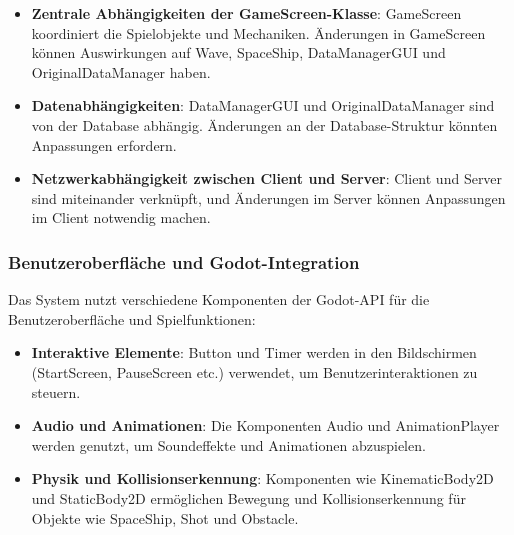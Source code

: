 \documentclass[10pt]{article}
\begin{document}
\begin{itemize}
    \item \textbf{Zentrale Abhängigkeiten der GameScreen-Klasse}: GameScreen koordiniert die Spielobjekte und Mechaniken. Änderungen in GameScreen können Auswirkungen auf Wave, SpaceShip, DataManagerGUI und OriginalDataManager haben.

    \item \textbf{Datenabhängigkeiten}: DataManagerGUI und OriginalDataManager sind von der Database abhängig. Änderungen an der Database-Struktur könnten Anpassungen erfordern.

    \item \textbf{Netzwerkabhängigkeit zwischen Client und Server}: Client und Server sind miteinander verknüpft, und Änderungen im Server können Anpassungen im Client notwendig machen.
\end{itemize}

\subsubsection{Benutzeroberfläche und Godot-Integration}

Das System nutzt verschiedene Komponenten der Godot-API für die Benutzeroberfläche und Spielfunktionen:

\begin{itemize}
    \item \textbf{Interaktive Elemente}: Button und Timer werden in den Bildschirmen (StartScreen, PauseScreen etc.) verwendet, um Benutzerinteraktionen zu steuern.

    \item \textbf{Audio und Animationen}: Die Komponenten Audio und AnimationPlayer werden genutzt, um Soundeffekte und Animationen abzuspielen.

    \item \textbf{Physik und Kollisionserkennung}: Komponenten wie KinematicBody2D und StaticBody2D ermöglichen Bewegung und Kollisionserkennung für Objekte wie SpaceShip, Shot und Obstacle.
\end{itemize}
\end{document}
